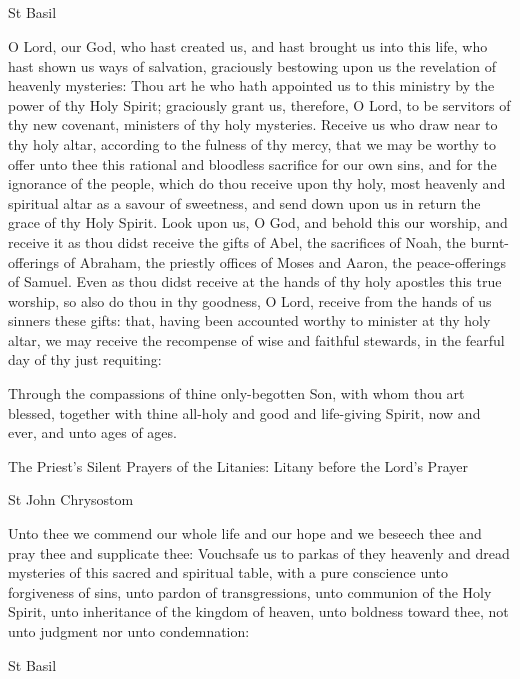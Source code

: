 \documentclass[
]{article}
\begin{document}
\subsection{}\label{section}

St Basil

O Lord, our God, who hast created us, and hast brought us into this
life, who hast shown us ways of salvation, graciously bestowing upon us
the revelation of heavenly mysteries: Thou art he who hath appointed us
to this ministry by the power of thy Holy Spirit; graciously grant us,
therefore, O Lord, to be servitors of thy new covenant, ministers of thy
holy mysteries. Receive us who draw near to thy holy altar, according to
the fulness of thy mercy, that we may be worthy to offer unto thee this
rational and bloodless sacrifice for our own sins, and for the ignorance
of the people, which do thou receive upon thy holy, most heavenly and
spiritual altar as a savour of sweetness, and send down upon us in
return the grace of thy Holy Spirit. Look upon us, O God, and behold
this our worship, and receive it as thou didst receive the gifts of
Abel, the sacrifices of Noah, the burnt-offerings of Abraham, the
priestly offices of Moses and Aaron, the peace-offerings of Samuel. Even
as thou didst receive at the hands of thy holy apostles this true
worship, so also do thou in thy goodness, O Lord, receive from the hands
of us sinners these gifts: that, having been accounted worthy to
minister at thy holy altar, we may receive the recompense of wise and
faithful stewards, in the fearful day of thy just requiting:

Through the compassions of thine only-begotten Son, with whom thou art
blessed, together with thine all-holy and good and life-giving Spirit,
now and ever, and unto ages of ages.

The Priest's Silent Prayers of the Litanies: Litany before the Lord's
Prayer

St John Chrysostom

Unto thee we commend our whole life and our hope and we beseech thee and
pray thee and supplicate thee: Vouchsafe us to parkas of they heavenly
and dread mysteries of this sacred and spiritual table, with a pure
conscience unto forgiveness of sins, unto pardon of transgressions, unto
communion of the Holy Spirit, unto inheritance of the kingdom of heaven,
unto boldness toward thee, not unto judgment nor unto condemnation:

St Basil
\end{document}
